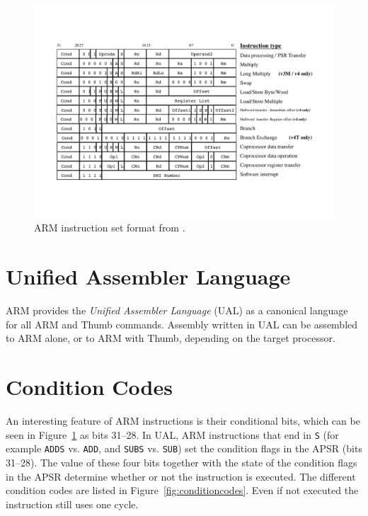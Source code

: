 \documentclass[oneside,a4paper]{report}
\begin{document}
\begin{figure}[htbp]
	\centering
	\includegraphics[width=1.0\textwidth]{./fig/InstructionFormat.pdf}
	\caption{ARM instruction set format from \cite[p. 13]{ARMInst}.}
	\label{fig:instructionformat}
\end{figure}

\section{Unified Assembler Language}
ARM provides the \emph{Unified Assembler Language} (UAL) as a canonical language for all ARM and Thumb commands. Assembly written in UAL can be assembled to ARM alone, or to ARM with Thumb, depending on the target processor.

\section{Condition Codes}
An interesting feature of ARM instructions is their conditional bits, which can be seen in Figure~\ref{fig:instructionformat} as bits 31--28. In UAL, ARM instructions that end in \texttt{S} (for example \texttt{ADDS} vs. \texttt{ADD}, and \texttt{SUBS} vs. \texttt{SUB}) set the condition flags in the APSR (bits 31--28). The value of these four bits together with the state of the condition flags in the APSR determine whether or not the instruction is executed. The different condition codes are listed in Figure~\ref{fig:conditioncodes}. Even if not executed the instruction still uses one cycle.
\end{document}
